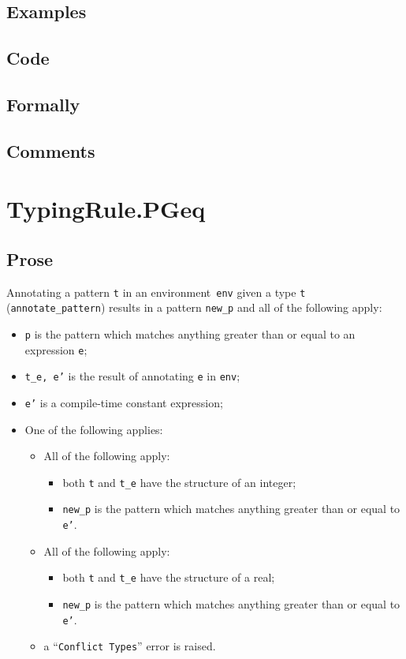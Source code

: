 \documentclass{book}
\begin{document}
  \subsection{Examples}

  \subsection{Code}

  \subsection{Formally}

  \subsection{Comments}

\section{TypingRule.PGeq \label{sec:TypingRule.PGeq}}

  \subsection{Prose}
   Annotating a pattern \texttt{t} in an environment~\texttt{env} given a type \texttt{t} (\texttt{annotate\_pattern}) results in a pattern \texttt{new\_p} and all of the following apply:
   \begin{itemize}
   \item \texttt{p} is the pattern which matches anything greater than or equal to an expression \texttt{e};
   \item \texttt{t\_e, e'} is the result of annotating \texttt{e} in \texttt{env}; 
   \item \texttt{e'} is a compile-time constant expression;
   \item One of the following applies:
     \begin{itemize}
     \item All of the following apply:
           \begin{itemize}
           \item both \texttt{t} and \texttt{t\_e} have the structure of an integer;
           \item \texttt{new\_p} is the pattern which matches anything greater than or equal to \texttt{e'}.
           \end{itemize}
     \item All of the following apply:
           \begin{itemize}
           \item both \texttt{t} and \texttt{t\_e} have the structure of a real;
           \item \texttt{new\_p} is the pattern which matches anything greater than or equal to \texttt{e'}.
           \end{itemize} 
     \item a ``\texttt{Conflict Types}'' error is raised.
     \end{itemize}
   \end{itemize}
\end{document}
